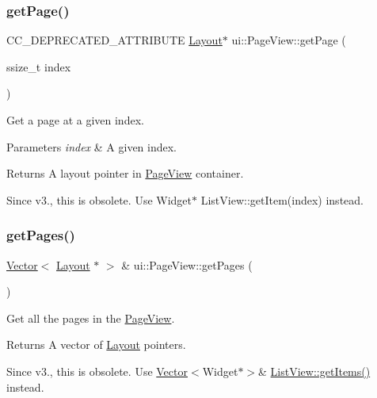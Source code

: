 \subsubsection{\texorpdfstring{get\+Page()}{getPage()}\hspace{0.1cm}{\footnotesize\ttfamily [2/2]}}
{\footnotesize\ttfamily C\+C\+\_\+\+D\+E\+P\+R\+E\+C\+A\+T\+E\+D\+\_\+\+A\+T\+T\+R\+I\+B\+U\+TE \hyperlink{classui_1_1Layout}{Layout}$\ast$ ui\+::\+Page\+View\+::get\+Page (\begin{DoxyParamCaption}\item[{ssize\+\_\+t}]{index }\end{DoxyParamCaption})}



Get a page at a given index. 


\begin{DoxyParams}{Parameters}
{\em index} & A given index. \\
\hline
\end{DoxyParams}
\begin{DoxyReturn}{Returns}
A layout pointer in \hyperlink{classui_1_1PageView}{Page\+View} container.
\end{DoxyReturn}
Since v3., this is obsolete. Use {\ttfamily Widget$\ast$ List\+View\+::get\+Item(index)} instead. \mbox{\label{classui_1_1PageView_a85a0a173c08718f0d84a3eb5c8c2c2bb}} 
\subsubsection{\texorpdfstring{get\+Pages()}{getPages()}\hspace{0.1cm}{\footnotesize\ttfamily [1/2]}}
{\footnotesize\ttfamily \hyperlink{classVector}{Vector}$<$ \hyperlink{classui_1_1Layout}{Layout} $\ast$ $>$ \& ui\+::\+Page\+View\+::get\+Pages (\begin{DoxyParamCaption}{ }\end{DoxyParamCaption})}



Get all the pages in the \hyperlink{classui_1_1PageView}{Page\+View}. 

\begin{DoxyReturn}{Returns}
A vector of \hyperlink{classui_1_1Layout}{Layout} pointers.
\end{DoxyReturn}
Since v3., this is obsolete. Use {\ttfamily \hyperlink{classVector}{Vector}$<$Widget$\ast$$>$\& \hyperlink{classui_1_1ListView_a92a6e83bdbfec80ae5133ab7ccd0a824}{List\+View\+::get\+Items()}} instead. \mbox{\label{classui_1_1PageView_a0615c5ffc511cb07537188b9281513f1}} 
